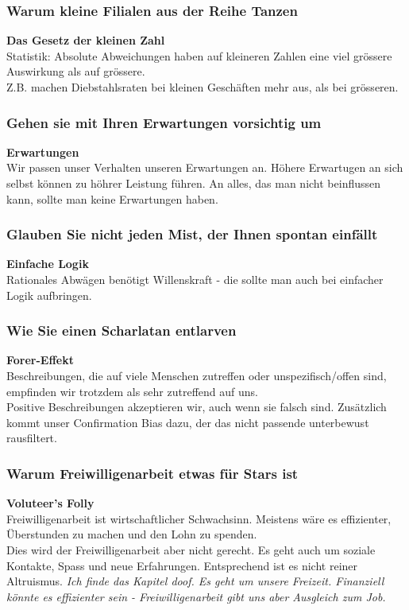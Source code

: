 \documentclass[a4paper, twocolumn]{article}
\begin{document}
\subsubsection*{Warum kleine Filialen aus der Reihe Tanzen}
\textbf{Das Gesetz der kleinen Zahl}\\
Statistik: Absolute Abweichungen haben auf kleineren Zahlen eine viel grössere Auswirkung als auf grössere.\\
Z.B. machen Diebstahlsraten bei kleinen Geschäften mehr aus, als bei grösseren.

\subsubsection*{Gehen sie mit Ihren Erwartungen vorsichtig um}
\textbf{Erwartungen}\\ 
Wir passen unser Verhalten unseren Erwartungen an. Höhere Erwartugen an sich selbst können zu höhrer Leistung führen. An alles, das man nicht beinflussen kann, sollte man keine Erwartungen haben.

\subsubsection*{Glauben Sie nicht jeden Mist, der Ihnen spontan einfällt}
\textbf{Einfache Logik}\\
Rationales Abwägen benötigt Willenskraft - die sollte man auch bei einfacher Logik aufbringen.

\subsubsection*{Wie Sie einen Scharlatan entlarven}
\textbf{Forer-Effekt}\\
Beschreibungen, die auf viele Menschen zutreffen oder unspezifisch/offen sind, empfinden wir trotzdem als sehr zutreffend auf uns.\\
Positive Beschreibungen akzeptieren wir, auch wenn sie falsch sind. Zusätzlich kommt unser Confirmation Bias dazu, der das nicht passende unterbewust rausfiltert.

\subsubsection*{Warum Freiwilligenarbeit etwas für Stars ist}
\textbf{Voluteer's Folly}\\
Freiwilligenarbeit ist wirtschaftlicher Schwachsinn. Meistens wäre es effizienter, Überstunden zu machen und den Lohn zu spenden.\\
Dies wird der Freiwilligenarbeit aber nicht gerecht. Es geht auch um soziale Kontakte, Spass und neue Erfahrungen. Entsprechend ist es nicht reiner Altruismus.
\textit{Ich finde das Kapitel doof. Es geht um unsere Freizeit. Finanziell könnte es effizienter sein - Freiwilligenarbeit gibt uns aber Ausgleich zum Job.}
\end{document}
